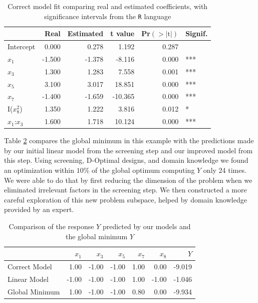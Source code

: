 \documentclass[conference]{IEEEtran}
\begin{document}
\begin{table}[ht]
\centering
\caption{Correct model fit comparing real and estimated coefficients, with significance intervals from the \texttt{R} language}
\label{tab:correct_fit}
\begingroup\small
\begin{tabular}{lrrrrl}
  \toprule
 & Real & Estimated & t value & Pr$(>|\text{t}|)$ & Signif. \\
  \midrule
Intercept & 0.000 & 0.278 & 1.192 & 0.287 &   \\
  $x_1$ & -1.500 & -1.378 & -8.116 & 0.000 & *** \\
  $x_3$ & 1.300 & 1.283 & 7.558 & 0.001 & *** \\
  $x_5$ & 3.100 & 3.017 & 18.851 & 0.000 & *** \\
  $x_7$ & -1.400 & -1.659 & -10.365 & 0.000 & *** \\
  I($x_8^2$) & 1.350 & 1.222 & 3.816 & 0.012 & * \\
  $x_1$:$x_3$ & 1.600 & 1.718 & 10.124 & 0.000 & *** \\
   \bottomrule
\end{tabular}
\endgroup
\end{table}

Table \ref{tab:prediction_comparisons} compares the global minimum in this
example with the predictions made by our initial linear model from the screening
step and our improved model from this step. Using screening, D-Optimal designs,
and domain knowledge we found an optimization within \(10\%\) of the global
optimum computing \(Y\) only 24 times. We were able to do that by first reducing
the dimension of the problem when we eliminated irrelevant factors in the
screening step. We then constructed a more careful exploration of this new
problem subspace, helped by domain knowledge provided by an expert.

\begin{table}[ht]
\centering
\caption{Comparison of the response $Y$ predicted by our models and the global minimum $Y$}
\label{tab:prediction_comparisons}
\begingroup\footnotesize
\begin{tabular}{lrrrrrr}
  \toprule
 & $x_1$ & $x_3$ & $x_5$ & $x_7$ & $x_8$ & $Y$ \\
  \midrule
Correct Model & 1.00 & -1.00 & -1.00 & 1.00 & 0.00 & -9.019 \\
  Linear Model & -1.00 & -1.00 & -1.00 & 1.00 & -1.00 & -1.046 \\
  Global Minimum & 1.00 & -1.00 & -1.00 & 0.80 & 0.00 & -9.934 \\
   \bottomrule
\end{tabular}
\endgroup
\end{table}
\end{document}
